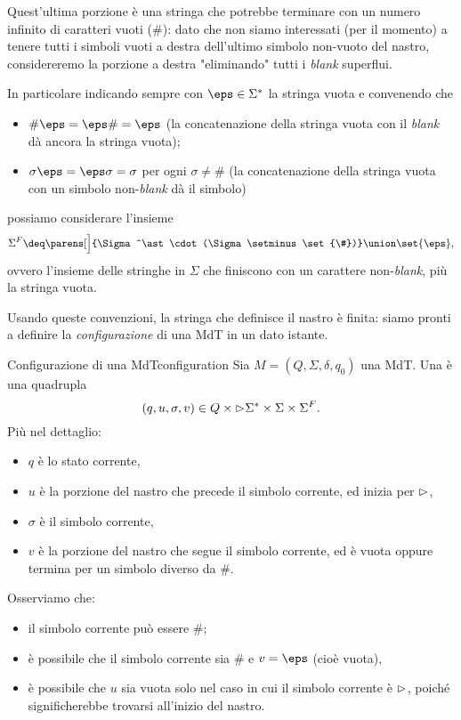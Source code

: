 Quest'ultima porzione è una stringa che potrebbe terminare con un numero infinito di caratteri vuoti ($\#$): dato che non siamo interessati (per il momento) a tenere tutti i simboli vuoti a destra dell'ultimo simbolo non-vuoto del nastro, considereremo la porzione a destra "eliminando" tutti i \emph{blank} superflui.

In particolare indicando sempre con $\eps \in \Sigma^\ast$ la stringa vuota e convenendo che \begin{itemize}
    \item $\#\eps = \eps\# = \eps$ (la concatenazione della stringa vuota con il \emph{blank} dà ancora la stringa vuota);
    \item $\sigma\eps = \eps\sigma = \sigma$ per ogni $\sigma \neq \#$ (la concatenazione della stringa vuota con un simbolo non-\emph{blank} dà il simbolo) 
\end{itemize}
possiamo considerare l'insieme \[
    \Sigma^{F} \deq \parens[\Big]{\Sigma^\ast \cdot (\Sigma \setminus \set{\#})} \union \set{\eps},
\] ovvero l'insieme delle stringhe in $\Sigma$ che finiscono con un carattere non-\emph{blank}, più la stringa vuota.

Usando queste convenzioni, la stringa che definisce il nastro è finita: siamo pronti a definire la \emph{configurazione} di una MdT in un dato istante.

\begin{definition}
    {Configurazione di una MdT}{configuration}
    Sia $M = (Q, \Sigma, \delta, q_0)$ una MdT. Una  è una quadrupla \[
        (q, u, \sigma, v) \in Q \times {\vartriangleright}\Sigma^\ast \times \Sigma \times \Sigma^F.
    \] Più nel dettaglio:
    \begin{itemize}
        \item $q$ è lo stato corrente,
        \item $u$ è la porzione del nastro che precede il simbolo corrente, ed inizia per ${\vartriangleright}$,
        \item $\sigma$ è il simbolo corrente,
        \item $v$ è la porzione del nastro che segue il simbolo corrente, ed è vuota oppure termina per un simbolo diverso da $\#$. 
    \end{itemize}
\end{definition}

Osserviamo che:
\begin{itemize}
    \item il simbolo corrente può essere $\#$;
    \item è possibile che il simbolo corrente sia $\#$ e $v = \eps$ (cioè vuota),
    \item è possibile che $u$ sia vuota solo nel caso in cui il simbolo corrente è ${\vartriangleright}$, poiché significherebbe trovarsi all'inizio del nastro.    
\end{itemize}

